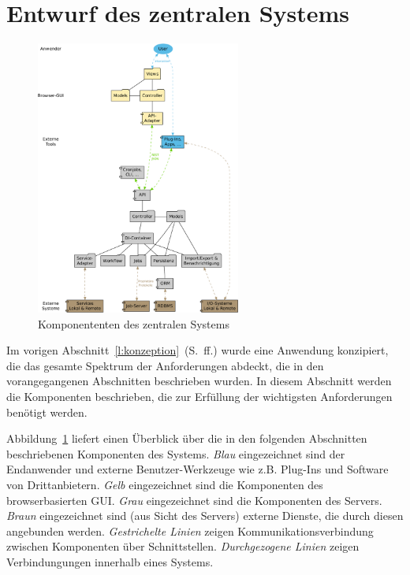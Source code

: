 \section{Entwurf des zentralen Systems}\label{l:entwurf}

\begin{figure}[htb]
\begin{center}
\includegraphics[width=0.6\textwidth]{media/komponenten.pdf}
\end{center}
\caption{Komponententen des zentralen Systems}
\label{chart:komponenten}
\end{figure}

Im vorigen Abschnitt~\ref{l:konzeption}~(S.\pageref{l:konzeption}~ff.) wurde eine Anwendung konzipiert, die das gesamte Spektrum der Anforderungen abdeckt, die in den vorangegangenen Abschnitten beschrieben wurden. In diesem Abschnitt werden die Komponenten beschrieben, die zur Erfüllung der wichtigsten Anforderungen benötigt werden. 

Abbildung~\ref{chart:komponenten} liefert einen Überblick über die in den folgenden Abschnitten beschriebenen Komponenten des Systems. \emph{Blau} eingezeichnet sind der Endanwender und externe Benutzer-Werkzeuge wie z.B. Plug-Ins und Software von Drittanbietern. \emph{Gelb} eingezeichnet sind die Komponenten des browserbasierten GUI. \emph{Grau} eingezeichnet sind die Komponenten des Servers. \emph{Braun} eingezeichnet sind (aus Sicht des Servers) externe Dienste, die durch diesen angebunden werden. \emph{Gestrichelte Linien} zeigen Kommunikationsverbindung zwischen Komponenten über Schnittstellen. \emph{Durchgezogene Linien} zeigen Verbindungungen innerhalb eines Systems. 

